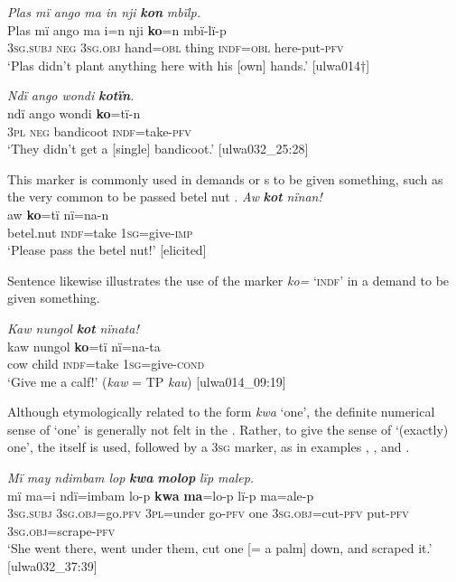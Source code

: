 \ea%
    \label{ex:det:62}
          \textit{Plas mï ango ma in nji} \textbf{\textit{kon}} \textit{mbïlp.}\\
\gll    Plas  mï      ango  ma      i=n      nji    \textbf{ko}=n mbï-lï{}-p\\
    [name]  3\textsc{sg.subj}  \textsc{neg}  3\textsc{sg.obj}  hand=\textsc{obl}  thing  \textsc{indf}=\textsc{obl}  here-put-\textsc{pfv}\\
\glt `Plas didn’t plant anything here with his [own] hands.’ [ulwa014†]
\z

\ea%
    \label{ex:det:63}
          \textit{Ndï ango wondi} \textbf{\textit{kotïn}}.\\
\gll ndï  ango  wondi    \textbf{ko}=tï-n\\
    3\textsc{pl}  \textsc{neg}  bandicoot  \textsc{indf}=take-\textsc{pfv}\\
\glt `They didn’t get a [single] bandicoot.’ [ulwa032\_25:28]
\z

This marker is commonly used in demands or s to be given something, such as the very common  to be passed betel nut .
\ea%
    \label{ex:det:64}
          \textit{Aw} \textbf{\textit{kot}} \textit{nïnan!}\\
\gll    aw      \textbf{ko}=tï  nï=na-n\\
    betel.nut  \textsc{indf}=take  1\textsc{sg}=give-\textsc{imp}\\
\glt `Please pass the betel nut!’ [elicited]
\z


Sentence  likewise illustrates the use of the  marker \textit{ko=} ‘\textsc{indf}’ in a demand to be given something.

\ea%
    \label{ex:det:65}
          \textit{Kaw nungol} \textbf{\textit{kot}} \textit{nïnata!}\\
\gll    kaw  nungol  \textbf{ko}=tï  nï=na-ta\\
    cow  child  \textsc{indf}=take  1\textsc{sg}=give-\textsc{cond}\\
\glt `Give me a calf!’ (\textit{kaw} = TP \textit{kau}) [ulwa014\_09:19]
\z

Although etymologically related to the form \textit{kwa} ‘one’, the definite numerical sense of ‘one’ is generally not felt in the . Rather, to give the sense of ‘(exactly) one’, the  itself is used, followed by a 3\textsc{sg} marker, as in examples , , and .

\ea%
    \label{ex:det:66}
          \textit{Mï may ndimbam lop} \textbf{\textit{kwa}} \textbf{\textit{molop}} \textit{lïp malep.}\\
\gll    mï      ma=i        ndï=imbam  lo-p  \textbf{kwa} \textbf{ma}=lo-p      lï-p      ma=ale-p\\
    3\textsc{sg.subj}  3\textsc{sg.obj}=go.\textsc{pfv}  3\textsc{pl}=under    go-\textsc{pfv}  one    3\textsc{sg.obj}=cut-\textsc{pfv}  put-\textsc{pfv}  3\textsc{sg.obj}=scrape-\textsc{pfv}\\
\glt `She went there, went under them, cut one [= a palm] down, and scraped it.’ [ulwa032\_37:39]
\z

